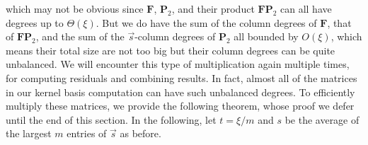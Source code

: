 which may not be obvious since $\mathbf{F}$, $\mathbf{P}_{2}$, and
their product $\mathbf{F}\mathbf{P}_{2}$ can all have degrees up
to $\Theta(\xi)$. But we do have the sum of the column degrees of
$\mathbf{F}$, that of $\mathbf{F}\mathbf{P}_{2}$, and the sum of
the $\vec{s}$-column degrees of $\mathbf{P}_{2}$ all bounded by
$O(\xi)$, which means their total size are not too big but their
column degrees can be quite unbalanced. We will encounter this type
of multiplication again multiple times, for computing residuals and
combining results. In fact, almost all of the matrices in our kernel
basis computation can have such unbalanced degrees. To efficiently
multiply these matrices, we provide the following theorem, whose proof
we defer until the end of this section. In the following, let $t=\xi/m$
and $s$ be the average of the largest $m$ entries of $\vec{s}$
as before.
